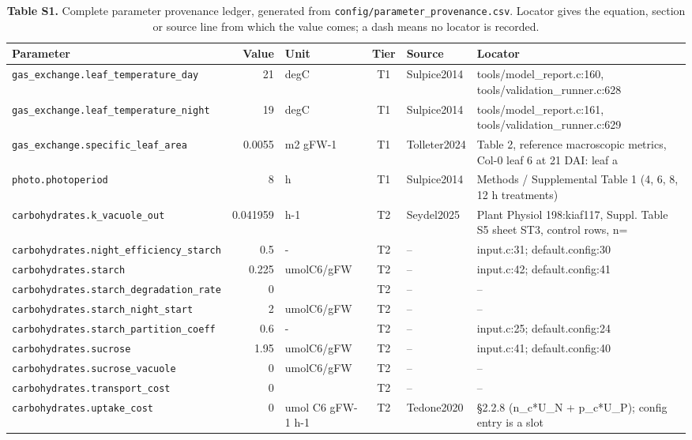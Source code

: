 \documentclass[a4paper,11pt]{article}
\begin{document}
\begin{table}[!htbp]
\centering
\tiny
\caption{\textbf{Table S1.} Complete parameter provenance ledger, generated from
\texttt{config/parameter\_provenance.csv}. Locator gives the equation, section or
source line from which the value comes; a dash means no locator is recorded.}
\label{tab:provenance_supp}
\begin{tabular}{@{}p{52mm}rp{20mm}cp{20mm}p{38mm}@{}}
\toprule
Parameter & Value & Unit & Tier & Source & Locator \\
\midrule
\texttt{gas\_exchange.leaf\_temperature\_day} & 21 & degC & T1 & Sulpice2014 & tools/model\_report.c:160, tools/validation\_runner.c:628 \\
\texttt{gas\_exchange.leaf\_temperature\_night} & 19 & degC & T1 & Sulpice2014 & tools/model\_report.c:161, tools/validation\_runner.c:629 \\
\texttt{gas\_exchange.specific\_leaf\_area} & 0.0055 & m2 gFW-1 & T1 & Tolleter2024 & Table 2, reference macroscopic metrics, Col-0 leaf 6 at 21 DAI: leaf a \\
\texttt{photo.photoperiod} & 8 & h & T1 & Sulpice2014 & Methods / Supplemental Table 1 (4, 6, 8, 12 h treatments) \\
\texttt{carbohydrates.k\_vacuole\_out} & 0.041959 & h-1 & T2 & Seydel2025 & Plant Physiol 198:kiaf117, Suppl. Table S5 sheet ST3, control rows, n= \\
\texttt{carbohydrates.night\_efficiency\_starch} & 0.5 & - & T2 & -- & input.c:31; default.config:30 \\
\texttt{carbohydrates.starch} & 0.225 & umolC6/gFW & T2 & -- & input.c:42; default.config:41 \\
\texttt{carbohydrates.starch\_degradation\_rate} & 0 &  & T2 & -- & -- \\
\texttt{carbohydrates.starch\_night\_start} & 2 & umolC6/gFW & T2 & -- & -- \\
\texttt{carbohydrates.starch\_partition\_coeff} & 0.6 & - & T2 & -- & input.c:25; default.config:24 \\
\texttt{carbohydrates.sucrose} & 1.95 & umolC6/gFW & T2 & -- & input.c:41; default.config:40 \\
\texttt{carbohydrates.sucrose\_vacuole} & 0 & umolC6/gFW & T2 & -- & -- \\
\texttt{carbohydrates.transport\_cost} & 0 &  & T2 & -- & -- \\
\texttt{carbohydrates.uptake\_cost} & 0 & umol C6 gFW-1 h-1 & T2 & Tedone2020 & §2.2.8 (n\_c*U\_N + p\_c*U\_P); config entry is a slot \\

\end{tabular}
\end{table}
\end{document}
